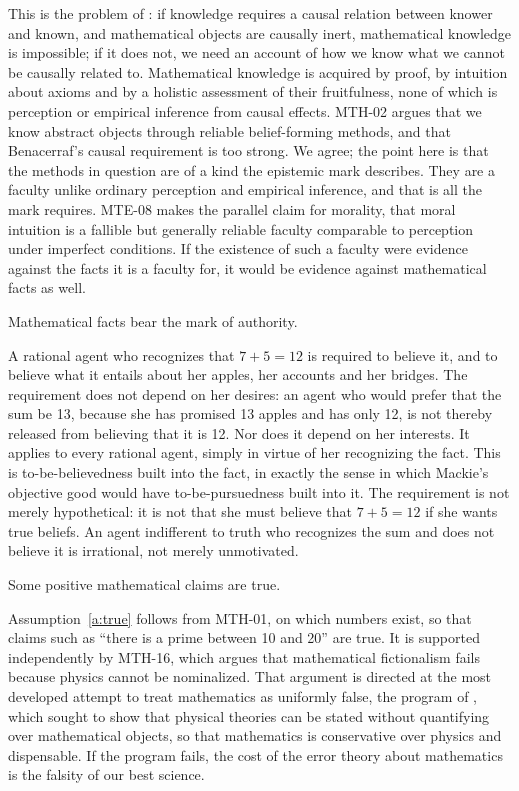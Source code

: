 \documentclass{situationist-preprint}
\begin{document}
This is the problem of \citet{Benacerraf1973}: if knowledge requires a causal relation between knower and known, and mathematical objects are causally inert, mathematical knowledge is impossible; if it does not, we need an account of how we know what we cannot be causally related to. Mathematical knowledge is acquired by proof, by intuition about axioms and by a holistic assessment of their fruitfulness, none of which is perception or empirical inference from causal effects. MTH-02 argues that we know abstract objects through reliable belief-forming methods, and that Benacerraf's causal requirement is too strong. We agree; the point here is that the methods in question are of a kind the epistemic mark describes. They are a faculty unlike ordinary perception and empirical inference, and that is all the mark requires. MTE-08 makes the parallel claim for morality, that moral intuition is a fallible but generally reliable faculty comparable to perception under imperfect conditions. If the existence of such a faculty were evidence against the facts it is a faculty for, it would be evidence against mathematical facts as well.

\begin{assumption}\label{a:auth}
Mathematical facts bear the mark of authority.
\end{assumption}

A rational agent who recognizes that $7 + 5 = 12$ is required to believe it, and to believe what it entails about her apples, her accounts and her bridges. The requirement does not depend on her desires: an agent who would prefer that the sum be 13, because she has promised 13 apples and has only 12, is not thereby released from believing that it is 12. Nor does it depend on her interests. It applies to every rational agent, simply in virtue of her recognizing the fact. This is to-be-believedness built into the fact, in exactly the sense in which Mackie's objective good would have to-be-pursuedness built into it. The requirement is not merely hypothetical: it is not that she must believe that $7 + 5 = 12$ if she wants true beliefs. An agent indifferent to truth who recognizes the sum and does not believe it is irrational, not merely unmotivated.

\begin{assumption}\label{a:true}
Some positive mathematical claims are true.
\end{assumption}

Assumption~\ref{a:true} follows from MTH-01, on which numbers exist, so that claims such as \enquote{there is a prime between 10 and 20} are true. It is supported independently by MTH-16, which argues that mathematical fictionalism fails because physics cannot be nominalized. That argument is directed at the most developed attempt to treat mathematics as uniformly false, the program of \citet{Field1980}, which sought to show that physical theories can be stated without quantifying over mathematical objects, so that mathematics is conservative over physics and dispensable. If the program fails, the cost of the error theory about mathematics is the falsity of our best science.
\end{document}
